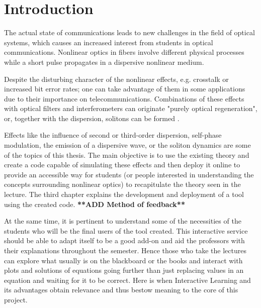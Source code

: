\chapter{Introduction}

The actual state of communications leads to new challenges in the field of optical systems, which causes an increased interest from students in optical communications. Nonlinear optics in fibers involve different physical processes while a short pulse propagates in a dispersive nonlinear medium. 

Despite the disturbing character of the nonlinear effects, e.g. crosstalk or increased bit error rates; one can take advantage of them in some applications due to their importance on telecommunications. Combinations of these effects with optical filters and interferometers can originate "purely optical regeneration",  or, together with the dispersion, solitons can be formed \cite{rein}.


Effects like the influence of second or third-order dispersion, self-phase modulation, the emission of a dispersive wave, or the soliton dynamics are some of the topics of this thesis. The main objective is to use the existing theory and create a code capable of simulating these effects and then deploy it online to provide an accessible way for students (or people interested in understanding the concepts surrounding nonlinear optics) to recapitulate the theory seen in the lecture. The third chapter explains the development and deployment of a tool using the created code. \textbf{**ADD Method of feedback**} 

At the same time, it is pertinent to understand some of the necessities of the students who will be the final users of the tool created. This interactive service should be able to adapt itself to be a good add-on and aid the professors with their explanations throughout the semester. Hence those who take the lectures can explore what usually is on the blackboard or the books and interact with plots and solutions of equations going further than just replacing values in an equation and waiting for it to be correct. Here is when Interactive Learning and its advantages obtain relevance and thus bestow meaning to the core of this project.

